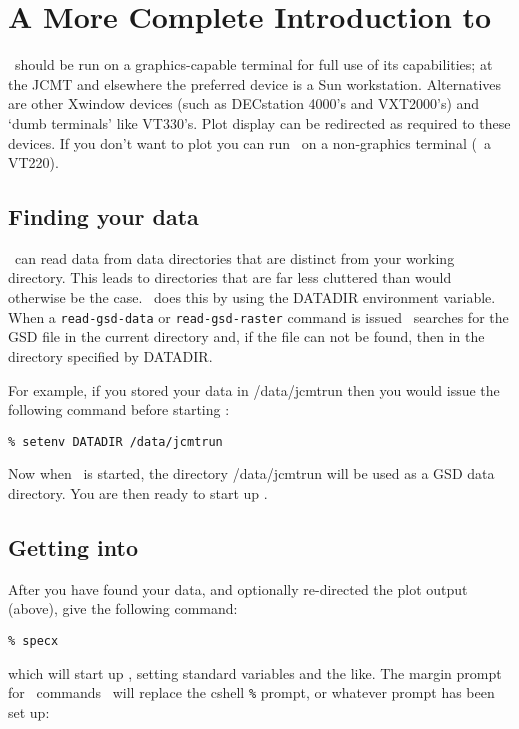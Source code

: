 
\section{%
A More Complete Introduction to \SPECX }
\label{sec:specx-intro}

\SPECX\ should be run on a graphics-capable terminal for full use of its 
capabilities; at the JCMT and elsewhere the preferred device is a Sun
workstation. Alternatives are other Xwindow devices (such as DECstation
4000's and VXT2000's) and `dumb terminals' like VT330's. Plot display
can be redirected as required to these devices. If you don't want to
plot you can run \SPECX\ on a non-graphics terminal (\eg\ a VT220).


\subsection{Finding your data}
\label{sec:finding-the-data}

\SPECX\ can read data from data directories that are distinct from your
working directory. This leads to directories that are far less cluttered than
would otherwise be the case. \SPECX\ does this by using the DATADIR 
environment variable. When a {\tt read-gsd-data} or {\tt read-gsd-raster}
command is issued \SPECX\ searches for the GSD file in the current directory
and, if the file can not be found, then in the directory specified by 
DATADIR.

For example, if you stored your data in /data/jcmtrun then you would issue the
following command before starting \SPECX:

\verb|% setenv DATADIR /data/jcmtrun|

Now when \SPECX\ is started, the directory /data/jcmtrun will be used as
a GSD data directory. You are then ready to start up \SPECX .

\subsection{Getting into \SPECX }
\label{sec:starting-specx}
After you have found your data, and optionally re-directed the plot
output (above), give the following command:

\verb|% specx|

which will start up \SPECX , setting standard variables and the
like. The margin prompt for \SPECX\ commands \SP\ will replace the cshell
{\tt \%} prompt, or whatever prompt has been set up:

